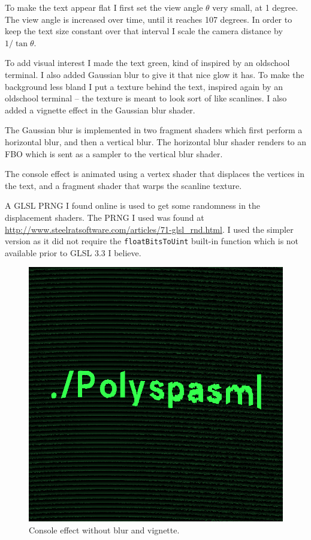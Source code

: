 \documentclass{acmsiggraph}               %
\begin{document}
To make the text appear flat I first set the view angle $\theta$ very small, at
1 degree.  The view angle is increased over time, until it reaches 107 degrees.
In order to keep the text size constant over that interval I scale the camera
distance by $1/\tan{\theta}$.

To add visual interest I made the text green, kind of inspired by an oldschool
terminal. I also added Gaussian blur to give it that nice glow it has. To make
the background less bland I put a texture behind the text, inspired again by an
oldschool terminal -- the texture is meant to look sort of like scanlines.
I also added a vignette effect in the Gaussian blur shader.

The Gaussian blur is implemented in two fragment shaders which first perform
a horizontal blur, and then a vertical blur. The horizontal blur shader renders
to an FBO which is sent as a sampler to the vertical blur shader.

The console effect is animated using a vertex shader that displaces the
vertices in the text, and a fragment shader that warps the scanline texture.

A GLSL PRNG I found online is used to get some randomness in the displacement
shaders. The PRNG I used was found at
\url{http://www.steelratsoftware.com/articles/71-glsl_rnd.html}. I used the
simpler version as it did not require the \texttt{floatBitsToUint} built-in
function which is not available prior to GLSL 3.3 I believe.

\begin{figure}[H]
    \centering
    \includegraphics[width=0.7\columnwidth]{console0.png}
    \caption{Console effect without blur and vignette.}
\end{figure}
\end{document}

